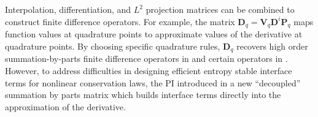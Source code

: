 \documentclass[preprint,10pt]{elsarticle}
\theoremstyle{definition}
\theoremstyle{lemma}
\theoremstyle{corollary}
\theoremstyle{theorem}
\theoremstyle{assumption}
\begin{document}
Interpolation, differentiation, and $L^2$ projection matrices can be combined to construct finite difference operators.  For example, the matrix $\bm{D}_q = \bm{V}_q\bm{D}^i\bm{P}_q$ maps function values at quadrature points to approximate values of the derivative at quadrature points.  By choosing specific quadrature rules, $\bm{D}_q$ recovers high order summation-by-parts finite difference operators in \cite{gassner2013skew, fernandez2014generalized, ranocha2018generalised} and certain operators in \cite{hicken2016multidimensional}.  However, to address difficulties in designing efficient entropy stable interface terms for nonlinear conservation laws, the PI introduced in \cite{chan2017discretely} a new ``decoupled'' summation by parts matrix which builds interface terms directly into the approximation of the derivative.  
\end{document}
